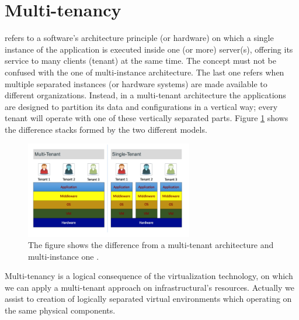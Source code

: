 %
%
\section{Multi-tenancy}
\label{sec:elasticity-multiTenancy}
 refers to a software's architecture principle (or hardware) on which a single instance
of the application is executed inside one (or more) server(s), offering its service to many clients (tenant)
at the same time. The concept must not be confused with the one of multi-instance architecture. The last one
refers when multiple separated instances (or hardware systems) are made available to different
organizations. Instead, in a multi-tenant architecture the applications are designed to partition 
its data and configurations in a vertical way; every tenant will operate with one of these vertically separated
parts. Figure \ref{img:elasticity-multiTenancy-difference} shows the difference stacks formed by the two
different models.

\begin{figure}
	\centering{}
	\includegraphics[width=0.65\textwidth]{chapters/elasticity/images/multi-tenancy.png}
	\caption[Multi-teanancy and multi-instance architecture]{The figure shows the difference from a multi-tenant
		architecture and multi-instance one \cite{multiTenancyAnymore}.}
	\label{img:elasticity-multiTenancy-difference}
\end{figure}

Multi-tenancy is a logical consequence of the virtualization technology, on which we can apply a multi-tenant
approach on infrastructural's resources. Actually we assist to creation of logically
separated virtual environments which operating on the same physical components. 


